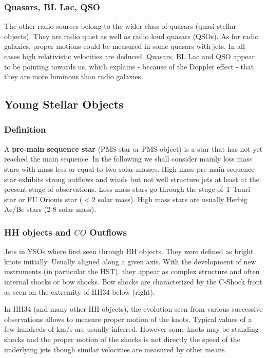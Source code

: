 \documentclass[10pt,a4paper,english,draft]{article}
\begin{document}
\subsubsection{Quasars, BL Lac, QSO}

The other radio sources belong to the wider class of quasars (quasi-stellar
objects). They are radio quiet as well as radio loud quasars (QSOs). As for
radio galaxies, proper motions could be measured in some quasars with jets. In
all cases high relativistic velocities are deduced. Quasars, BL Lac and QSO
appear to be pointing towards us, which explains - because of the Doppler
effect - that they are more luminous than radio galaxies.

\subsection{Young Stellar Objects}

\subsubsection{Definition}

A \textbf{pre-main sequence star} (PMS star or PMS object) is a star that has
not yet reached the main sequence. In the following we shall consider mainly
loss mass stars with mass less or equal to two solar masses. High mass pre-main
sequence star exhibits strong outflows and winds but not well structure jets at
least at the present stage of observations. Loss mass stars go through the
stage of T Tauri star or FU Orionis star ($<2$ solar mass). High mass stars are
usually Herbig Ae/Be stars (2-8 solar mass).

\subsubsection{\texorpdfstring{HH objects and $CO$ Outflows}{HH objects and CO Outflows}}

Jets in YSOs where first seen through HH objects. They were defined as bright
knots initially. Usually aligned along a given axis. With the development of
new instruments (in particular the HST), they appear as complex structure and
often internal shocks or bow shocks. Bow shocks are characterized by the
C-Shock front as seen on the extremity of HH34 below (right).

In HH34 (and many other HH objects), the evolution seen from various successive
observations allows to measure proper motion of the knots. Typical values of a
few hundreds of km/s are usually inferred. However some knots may be standing
shocks and the proper motion of the shocks is not directly the speed of the
underlying jets though similar velocities are measured by other means.
\end{document}
